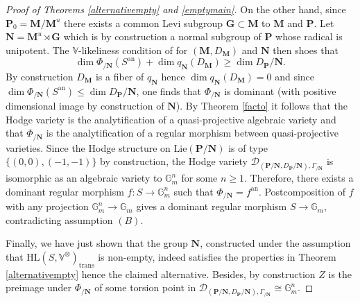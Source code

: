 \documentclass[10pt]{article}
\numberwithin{equation}{subsection}
\theoremstyle{plain}
\theoremstyle{definition}
\theoremstyle{remark}
\newcommand{\lie}{\mathrm{Lie}}
\newcommand{\V}{\mathbb V}
\newcommand{\mult}{\mathbb G}
\newcommand{\G}{\mathbf G}
\newcommand{\pp}{\mathbf P}
\newcommand{\M}{\mathbf M}
\newcommand{\NN}{\mathbf N}
\newcommand{\HL}{\mathrm{HL}(S, \V^\otimes)}
\newcommand{\an}{\mathrm{an}}
\newcommand{\period}{\mathscr{D}}
\newcommand{\trans}{\mathrm{trans}}
\begin{document}
\begin{proof}[Proof of Theorems \ref{alternativempty} and \ref{emptymain}]
On the other hand, since $\pp_0 = \M/\M^u$ there exists a common Levi subgroup $\G \subset \M$ to $\M$ and $\pp$. Let $\NN = \M^u \rtimes \G$ which is by construction a normal subgroup of $\pp$ whose radical is unipotent. The $\V$-likeliness condition of for $(\M, D_\M)$ and $\NN$ then shoes that
\[
\dim \Phi_{/\NN}(S^\an) + \dim q_\NN(D_\M) \geqslant \dim D_\pp/\NN.
\]
By construction $D_\M$ is a fiber of $q_\NN$ hence $\dim q_\NN(D_\M) = 0$ and since $\dim \Phi_{/\NN}(S^\an) \leqslant \dim D_\pp/\NN$, one finds that $\Phi_{/\NN}$ is dominant (with positive dimensional image by construction of $\NN$). By Theorem \ref{facto} it follows that the Hodge variety is the analytification of a quasi-projective algebraic variety and that $\Phi_{/\NN}$ is the analytification of a regular morphism between quasi-projective varieties. Since the Hodge structure on $\lie(\pp/\NN)$ is of type $\{(0,0), (-1,-1)\}$ by construction, the Hodge variety $\period_{(\pp/\NN, D_\pp/\NN), \Gamma_{/\NN}}$ is isomorphic as an algebraic variety to $\mult_m^n$ for some $n \geqslant 1$. Therefore, there exists a dominant regular morphism $f : S \rightarrow \mult_m^n$ such that $\Phi_{/\NN} = f^\an$. Postcomposition of $f$ with any projection $\mult_m^n \rightarrow \mult_m$ gives a dominant regular morphism $S \rightarrow \mult_m$, contradicting assumption $(B)$.

Finally, we have just shown that the group $\NN$, constructed under the assumption that $\HL_\trans$ is non-empty, indeed satisfies the properties in Theorem \ref{alternativempty} hence the claimed alternative. Besides, by construction $Z$ is the preimage under $\Phi_{/\NN}$ of some torsion point in $\period_{(\pp/\NN, D_\pp/\NN), \Gamma_{/\NN}} \cong \mult_m^n$.
\end{proof}
\end{document}
